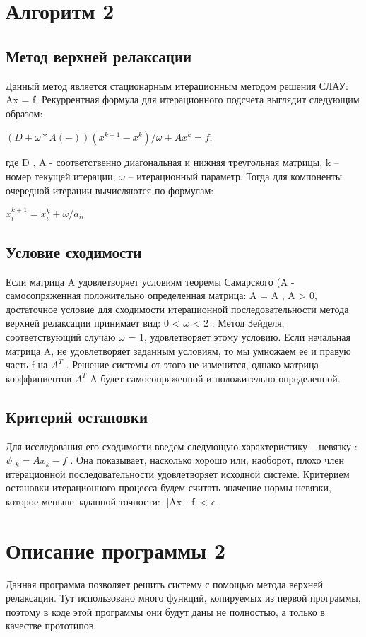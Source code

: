 \documentclass[a4paper,12pt,titlepage,finall]{article}
\begin{document}
\section{Алгоритм 2}
\subsection{Метод верхней релаксации}
Данный метод является стационарным итерационным методом решения СЛАУ: Ax = f.
Рекуррентная формула для итерационного подсчета выглядит следующим образом: 

$(D + \omega * A{(-)})(x^{k+1} - x^{k}) / \omega + Ax^{k} = f$,

где D , A - соответственно диагональная и нижняя треугольная матрицы, k – номер текущей итерации, $\omega$ – итерационный параметр. Тогда для компоненты очередной итерации вычисляются по формулам:

$x_{i}^{k+1} = x_{i}^{k} + \omega /a_{ii}$

\subsection{Условие сходимости}

Если матрица A удовлетворяет условиям теоремы Самарского (A - самосопряженная положительно определенная матрица: A = A , A > 0, достаточное условие для сходимости итерационной последовательности метода верхней релаксации принимает вид: 0 < $\omega$ < 2 . Метод Зейделя, соответствующий случаю $\omega$ = 1, удовлетворяет этому условию.
Если начальная матрица A, не удовлетворяет заданным условиям, то мы умножаем ее и правую часть f на $A^{T}$ . Решение системы от этого не изменится, однако матрица коэффициентов $A^{T}$ A будет самосопряженной и положительно определенной.
\subsection{Критерий остановки}

Для исследования его сходимости введем следующую характеристику – невязку : 
$\psi$ $_{k} = Ax_{k} - f$ . Она показывает, насколько хорошо или, наоборот, плохо член итерационной последовательности удовлетворяет исходной системе.
 Критерием остановки итерационного процесса будем считать значение нормы невязки, которое меньше заданной точности: ||Ax - f||< $\epsilon$ .

\newpage
\section{Описание программы 2}
Данная программа позволяет решить систему с помощью метода верхней релаксации. Тут использовано много функций, копируемых из первой программы, поэтому в коде этой программы они будут даны не полностью, а только в качестве прототипов.
\end{document}
